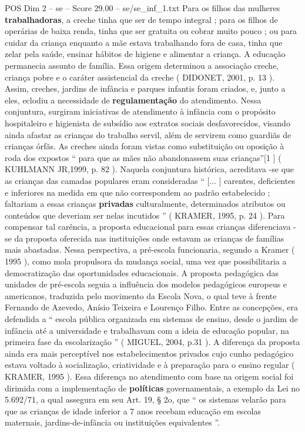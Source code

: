 \begin{textsample}{POS Dim 2 – se – Score 29.00 – se/se\_inf\_1.txt}
Para os filhos das mulheres \textbf{trabalhadoras}, a creche tinha que ser de tempo integral ; para os filhos de operárias de baixa renda, tinha que ser gratuita ou cobrar muito pouco ; ou para cuidar da criança enquanto a mãe estava trabalhando fora de casa, tinha que zelar pela saúde, ensinar hábitos de higiene e alimentar a criança.
A educação permanecia assunto de família.
Essa origem determinou a associação creche, criança pobre e o caráter assistencial da creche ( DIDONET, 2001, p. 13 ).
Assim, creches, jardins de infância e parques infantis foram criados, e, junto a eles, eclodiu a necessidade de \textbf{regulamentação} do atendimento.
Nessa conjuntura, surgiram iniciativas de atendimento à infância com o propósito hospitaleiro e higienista de subsídio aos extratos sociais desfavorecidos, visando ainda afastar as crianças do trabalho servil, além de servirem como guardiãs de crianças órfãs.
As creches ainda foram vistas como substituição ou oposição à roda dos expostos “ para que as mães não abandonassem suas crianças”[1 ] ( KUHLMANN JR,1999, p. 82 ).
Naquela conjuntura histórica, acreditava -se que as crianças das camadas populares eram consideradas “ [... ] carentes, deficientes e inferiores na medida em que não correspondem ao padrão estabelecido ; faltariam a essas crianças \textbf{privadas} culturalmente, determinados atributos ou conteúdos que deveriam ser nelas incutidos ” ( KRAMER, 1995, p. 24 ).
Para compensar tal carência, a proposta educacional para essas crianças diferenciava -se da proposta oferecida nas instituições onde estavam as crianças de famílias mais abastadas.
Nessa perspectiva, a pré-escola funcionaria, segundo a Kramer ( 1995 ), como mola propulsora da mudança social, uma vez que possibilitaria a democratização das oportunidades educacionais.
A proposta pedagógica das unidades de pré-escola seguia a influência dos modelos pedagógicos europeus e americanos, traduzida pelo movimento da Escola Nova, o qual teve à frente Fernando de Azevedo, Anísio Teixeira e Lourenço Filho.
Entre as concepções, era defendida a “ escola pública organizada em sistemas de ensino, desde o jardim de infância até a universidade e trabalhavam com a ideia de educação popular, na primeira fase da escolarização ” ( MIGUEL, 2004, p.31 ).
A diferença da proposta ainda era mais perceptível nos estabelecimentos privados cujo cunho pedagógico estava voltado à socialização, criatividade e à preparação para o ensino regular ( KRAMER, 1995 ).
Essa diferença no atendimento com base na origem social foi dirimida com a implementação de \textbf{políticas} governamentais, a exemplo da Lei no 5.692/71, a qual assegura em seu Art. 19, § 2o, que “ os sistemas velarão para que as crianças de idade inferior a 7 anos recebam educação em escolas maternais, jardins-de-infância ou instituições equivalentes ”.

\end{textsample}
